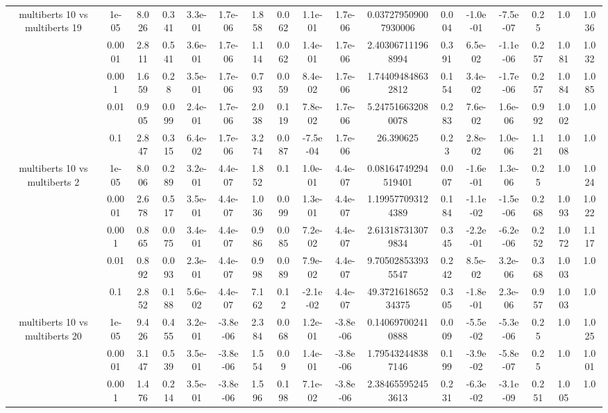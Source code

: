 \begin{tabular}{|c|c|c|c|c|c|c|c|c|c|c|c|c|c|c|c|c|}
\hline
\multirow{5}{*}{multiberts 10 vs multiberts 19} & 1e-05 & 8.026 & 0.341 & 3.3e-01 & 1.7e-06 & 1.858 & 0.062 & 1.1e-01 & 1.7e-06 & 0.037279509007930006 & 0.004 & -1.0e-01 & -7.5e-07 & 0.25 & 1.0 & 1.036 \\
 & 0.0001 & 2.811 & 0.541 & 3.6e-01 & 1.7e-06 & 1.114 & 0.062 & 1.4e-01 & 1.7e-06 & 2.403067111968994 & 0.391 & 6.5e-02 & -1.1e-06 & 0.257 & 1.081 & 1.032 \\
 & 0.001 & 1.659 & 0.28 & 3.5e-01 & 1.7e-06 & 0.793 & 0.059 & 8.4e-02 & 1.7e-06 & 1.744094848632812 & 0.154 & 3.4e-02 & -1.7e-06 & 0.257 & 1.084 & 1.085 \\
 & 0.01 & 0.905 & 0.099 & 2.4e-01 & 1.7e-06 & 2.038 & 0.119 & 7.8e-02 & 1.7e-06 & 5.247516632080078 & 0.283 & 7.6e-02 & 1.6e-06 & 0.992 & 1.002 & 1.0 \\
 & 0.1 & 2.847 & 0.315 & 6.4e-02 & 1.7e-06 & 3.274 & 0.087 & -7.5e-04 & 1.7e-06 & 26.390625 & 0.23 & 2.8e-02 & 1.0e-06 & 1.121 & 1.008 & 1.0 \\
\hline
\multirow{5}{*}{multiberts 10 vs multiberts 2} & 1e-05 & 8.006 & 0.289 & 3.2e-01 & 4.4e-07 & 1.852 & 0.1 & 1.0e-01 & 4.4e-07 & 0.08164749294519401 & 0.007 & -1.6e-01 & 1.3e-06 & 0.25 & 1.0 & 1.024 \\
 & 0.0001 & 2.678 & 0.517 & 3.5e-01 & 4.4e-07 & 1.036 & 0.099 & 1.3e-01 & 4.4e-07 & 1.199577093124389 & 0.184 & -1.1e-02 & -1.5e-06 & 0.268 & 1.093 & 1.022 \\
 & 0.001 & 0.865 & 0.075 & 3.4e-01 & 4.4e-07 & 0.986 & 0.085 & 7.2e-02 & 4.4e-07 & 2.613187313079834 & 0.345 & -2.2e-01 & -6.2e-06 & 0.252 & 1.072 & 1.117 \\
 & 0.01 & 0.892 & 0.093 & 2.3e-01 & 4.4e-07 & 0.998 & 0.089 & 7.9e-02 & 4.4e-07 & 9.705028533935547 & 0.242 & 8.5e-02 & 3.2e-06 & 0.368 & 1.003 & 1.0 \\
 & 0.1 & 2.852 & 0.188 & 5.6e-02 & 4.4e-07 & 7.162 & 0.12 & -2.1e-02 & 4.4e-07 & 49.372161865234375 & 0.305 & -1.8e-01 & 2.3e-06 & 0.957 & 1.003 & 1.0 \\
\hline
\multirow{5}{*}{multiberts 10 vs multiberts 20} & 1e-05 & 9.426 & 0.455 & 3.2e-01 & -3.8e-06 & 2.384 & 0.068 & 1.2e-01 & -3.8e-06 & 0.140697002410888 & 0.009 & -5.5e-02 & -5.3e-06 & 0.25 & 1.0 & 1.025 \\
 & 0.0001 & 3.147 & 0.539 & 3.5e-01 & -3.8e-06 & 1.554 & 0.09 & 1.4e-01 & -3.8e-06 & 1.795432448387146 & 0.199 & -3.9e-02 & -5.8e-07 & 0.25 & 1.0 & 1.001 \\
 & 0.001 & 1.476 & 0.214 & 3.5e-01 & -3.8e-06 & 1.596 & 0.198 & 7.1e-02 & -3.8e-06 & 2.384655952453613 & 0.231 & -6.3e-02 & -3.1e-09 & 0.251 & 1.005 & 1.0 \\

\end{tabular}
